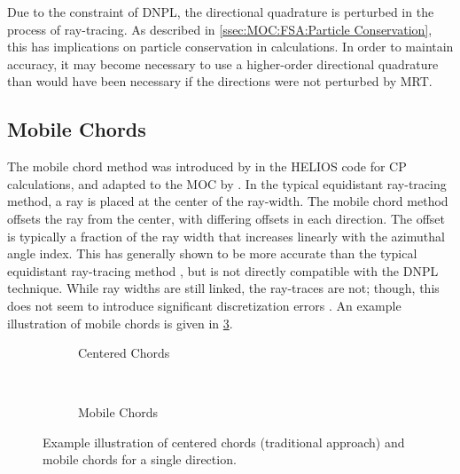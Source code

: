 {{{        Due to the constraint of \ac{DNPL}, the directional quadrature is perturbed in the process of ray-tracing.
        As described in \cref{ssec:MOC:FSA:Particle Conservation}, this has implications on particle conservation in calculations.
        In order to maintain accuracy, it may become necessary to use a higher-order directional quadrature than would have been necessary if the directions were not perturbed by \ac{MRT}.
      }

      \subsection{Mobile Chords}{\label{ssec:RT:Mobile Chords}
        The mobile chord method was introduced by \citet{Villarino1992} in the HELIOS code for \ac{CP} calculations, and adapted to the \ac{MOC} by \citet{Yamamoto2008}.
        In the typical equidistant ray-tracing method, a ray is placed at the center of the ray-width.
        The mobile chord method offsets the ray from the center, with differing offsets in each direction.
        The offset is typically a fraction of the ray width that increases linearly with the azimuthal angle index.
        This has generally shown to be more accurate than the typical equidistant ray-tracing method \cite{Yamamoto2008}, but is not directly compatible with the \ac{DNPL} technique.
        While ray widths are still linked, the ray-traces are not; though, this does not seem to introduce significant discretization errors \cite{Yamamoto2008}.
        An example illustration of mobile chords is given in \cref{figs:RT:MobileChords}.

        \begin{figure}[h]
          \centering
          \begin{subfigure}[t]{0.45\textwidth}
            \centering
            \def\svgwidth{0.85\textwidth}
            
            \caption{Centered Chords\label{fig:RT:MobileChords:Normal}}
          \end{subfigure}%
          ~
          \begin{subfigure}[t]{0.45\textwidth}
            \centering
            \def\svgwidth{0.85\textwidth}
            
            \caption{Mobile Chords\label{fig:RT:MobileChords:MobileChords}}
          \end{subfigure}
          \caption{Example illustration of centered chords (traditional approach) and mobile chords for a single direction.\label{figs:RT:MobileChords}}
        \end{figure}
      }

}}
